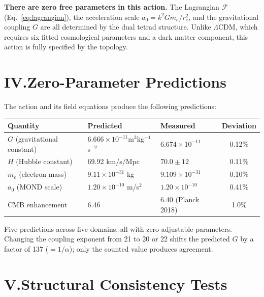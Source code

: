 \documentclass[11pt]{article}
\begin{document}
\textbf{There are zero free parameters in this action.}
The Lagrangian $\mathcal{F}$ (Eq.~\ref{eq:lagrangian}), the acceleration scale $a_0 = k^2 G m_e / r_e^2$, and the gravitational coupling $G$ are all determined by the dual tetrad structure.
Unlike $\Lambda$CDM, which requires six fitted cosmological parameters and a dark matter component, this action is fully specified by the topology.

\section*{IV.\quad Zero-Parameter Predictions}

The action and its field equations produce the following predictions:

\begin{center}
\begin{tabular}{lp{4.2cm}p{3.5cm}c}
\toprule
\textbf{Quantity} & \textbf{Predicted} & \textbf{Measured} & \textbf{Deviation} \\
\midrule
$G$ (gravitational constant) & $6.666 \times 10^{-11}$\newline m$^3$kg$^{-1}$s$^{-2}$ & $6.674 \times 10^{-11}$ & 0.12\% \\[4pt]
$H$ (Hubble constant) & 69.92 km/s/Mpc & $70.0 \pm 12$ & 0.11\% \\[4pt]
$m_e$ (electron mass) & $9.11 \times 10^{-31}$ kg & $9.109 \times 10^{-31}$ & 0.10\% \\[4pt]
$a_0$ (MOND scale) & $1.20 \times 10^{-10}$ m/s$^2$ & $1.20 \times 10^{-10}$ & 0.41\% \\[4pt]
CMB enhancement & 6.46 & 6.40 (Planck 2018) & 1.0\% \\
\bottomrule
\end{tabular}
\end{center}
\vspace{0.3em}

\noindent
Five predictions across five domains, all with zero adjustable parameters.
Changing the coupling exponent from 21 to 20 or 22 shifts the predicted $G$ by a factor of 137 ($= 1/\alpha$); only the counted value produces agreement.

\section*{V.\quad Structural Consistency Tests}
\end{document}
